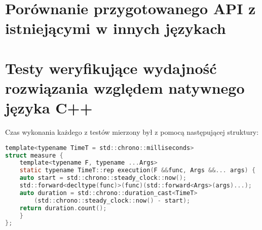 \documentclass[a4paper,10pt]{report}
\begin{document}
\section{Porównanie przygotowanego API z istniejącymi w innych językach}
\section{Testy weryfikujące wydajność rozwiązania względem natywnego języka C++}
Czas wykonania każdego z testów mierzony był z pomocą następującej struktury:
\begin{lstlisting}[caption={Pomiar czasu\cite{timer}},label={lst:timer},language=c]
template<typename TimeT = std::chrono::milliseconds>
struct measure {
	template<typename F, typename ...Args>
	static typename TimeT::rep execution(F &&func, Args &&... args) {
	auto start = std::chrono::steady_clock::now();
	std::forward<decltype(func)>(func)(std::forward<Args>(args)...);
	auto duration = std::chrono::duration_cast<TimeT>
		(std::chrono::steady_clock::now() - start);
	return duration.count();
	}
};
\end{lstlisting}
\end{document}

